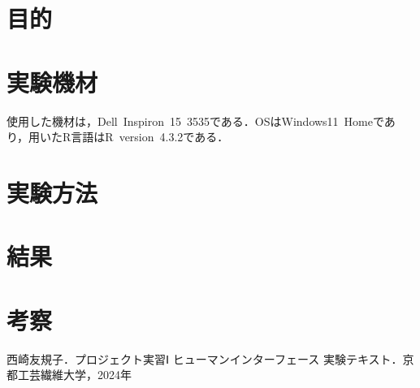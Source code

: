 \documentclass{jlreq}
\numberwithin{equation}{section}
\begin{document}
\tableofcontents
\clearpage

\section{目的}

\section{実験機材}
使用した機材は，Dell\ Inspiron\ 15\ 3535である．OSはWindows11\ Homeであり，用いたR言語はR\ version\ 4.3.2である．

\section{実験方法}

\section{結果}

\section{考察}

\begin{thebibliography}{9}
  \item 西崎友規子．プロジェクト実習Ⅰ ヒューマンインターフェース 実験テキスト．京都工芸繊維大学，2024年
\end{thebibliography}
\end{document}
